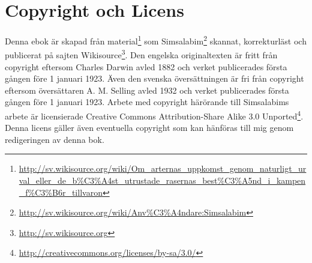 \chapter{Copyright och Licens}
Denna ebok är skapad från material\footnote{\url{http://sv.wikisource.org/wiki/Om_arternas_uppkomst_genom_naturligt_urval_eller_de_b\%C3\%A4st_utrustade_rasernas_best\%C3\%A5nd_i_kampen_f\%C3\%B6r_tillvaron}} som Simsalabim\footnote{\url{http://sv.wikisource.org/wiki/Anv\%C3\%A4ndare:Simsalabim}} skannat, korrekturläst och publicerat på sajten 
Wikisource\footnote{\url{http://sv.wikisource.org}}. Den engelska originaltexten är fritt från copyright eftersom Charles Darwin avled 1882 och verket publicerades första gången före 1 januari 1923. Även den svenska översättningen är fri från copyright eftersom översättaren A. M. Selling avled 1932 och verket publicerades första gången före 1 januari 1923. Arbete med copyright härörande till Simsalabims arbete är licensierade Creative Commons Attribution-Share Alike 3.0 Unported\footnote{\url{http://creativecommons.org/licenses/by-sa/3.0/}}. Denna licens gäller även eventuella copyright som kan hänföras till mig genom redigeringen av denna bok.

